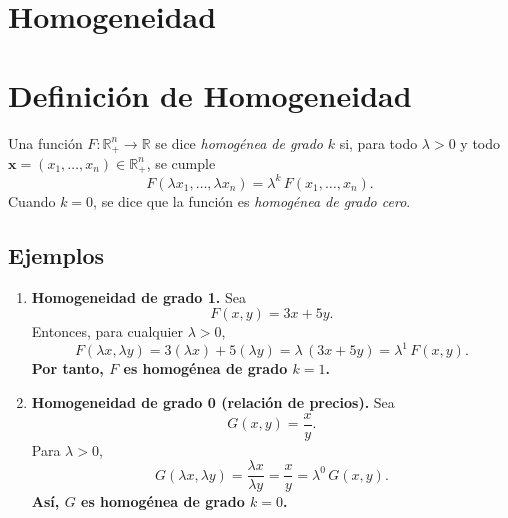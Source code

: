 \documentclass{article}
\begin{document}
\newpage

\section{Homogeneidad}


\section*{Definición de Homogeneidad}
Una función \(F:\mathbb{R}^n_{+}\to\mathbb{R}\) se dice \emph{homogénea de grado} \(k\) si, para todo \(\lambda>0\) y todo \(\mathbf{x}=(x_1,\dots,x_n)\in\mathbb{R}^n_{+}\), se cumple
\[
F(\lambda x_1,\dots,\lambda x_n)
=\lambda^k\,F(x_1,\dots,x_n).
\]
Cuando \(k=0\), se dice que la función es \emph{\color{teal} homogénea de grado cero}.


\subsection*{Ejemplos}

\begin{enumerate}
  \item \textbf{Homogeneidad de grado 1.}  
    Sea
    \[
      F(x,y) = 3x + 5y.
    \]
    Entonces, para cualquier \(\lambda>0\),
    \[
      F(\lambda x,\lambda y)
      =3(\lambda x) + 5(\lambda y)
      =\lambda\,(3x+5y)
      =\lambda^1\,F(x,y).
    \]
\textbf{\color{teal}    Por tanto, \(F\) es homogénea de grado \(k=1\).
}
  \item \textbf{Homogeneidad de grado 0 (relación de precios).}  
    Sea
    \[
      G(x,y) = \frac{x}{y}.
    \]
    Para \(\lambda>0\),
    \[
      G(\lambda x,\lambda y)
      =\frac{\lambda x}{\lambda y}
      =\frac{x}{y}
      =\lambda^0\,G(x,y).
    \]
\textbf{  \color{teal}  Así, \(G\) es homogénea de grado \(k=0\).}

\end{enumerate}
\end{document}
